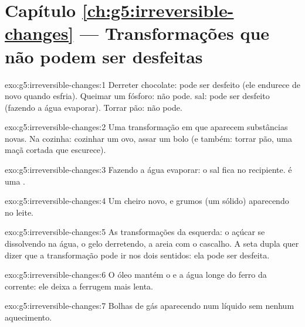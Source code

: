 \section*{Capítulo \ref{ch:g5:irreversible-changes} --- Transformações que não podem ser desfeitas}

\begin{solution}{exo:g5:irreversible-changes:1}
Derreter chocolate: pode ser desfeito (ele endurece de novo quando
esfria). Queimar um fósforo: não pode.  sal: pode ser desfeito
(fazendo a água evaporar). Torrar pão: não pode.
\end{solution}

\begin{solution}{exo:g5:irreversible-changes:2}
Uma transformação em que aparecem substâncias novas. Na cozinha:
cozinhar um ovo, assar um bolo (e também: torrar pão, uma maçã cortada
que escurece).
\end{solution}

\begin{solution}{exo:g5:irreversible-changes:3}
Fazendo a água evaporar: o sal fica no recipiente.  é uma
.
\end{solution}

\begin{solution}{exo:g5:irreversible-changes:4}
Um cheiro novo, e grumos (um sólido) aparecendo no leite.
\end{solution}

\begin{solution}{exo:g5:irreversible-changes:5}
As transformações da esquerda: o açúcar se dissolvendo na água, o gelo
derretendo, a areia  com o cascalho. A seta dupla quer dizer
que a transformação pode ir nos dois sentidos: ela pode ser desfeita.
\end{solution}

\begin{solution}{exo:g5:irreversible-changes:6}
O óleo mantém o  e a água longe do ferro da corrente: ele deixa a
ferrugem mais lenta.
\end{solution}

\begin{solution}{exo:g5:irreversible-changes:7}
Bolhas de gás aparecendo num líquido sem nenhum aquecimento.
\end{solution}

